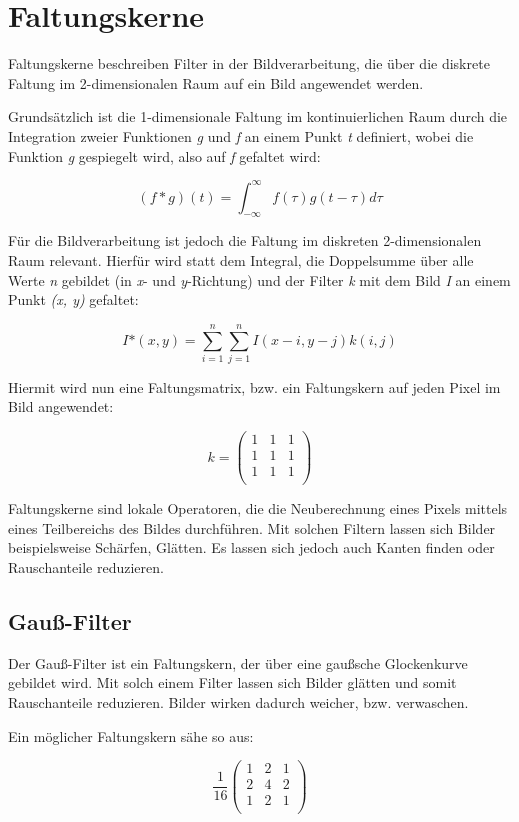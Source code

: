 \section{Faltungskerne} %
\label{sec:Faltungskerne}
Faltungskerne beschreiben Filter in der Bildverarbeitung, die über die diskrete Faltung im 2-dimensionalen
Raum auf ein Bild angewendet werden.

Grundsätzlich ist die 1-dimensionale Faltung im kontinuierlichen Raum durch die Integration zweier Funktionen {\em g} und {\em f} an einem Punkt {\em t} definiert, wobei die Funktion {\em g} gespiegelt wird, also auf {\em f} gefaltet wird:

$$ (f * g)(t) = \int_{-\infty}^{\infty} f(\tau)g(t - \tau) d\tau $$

Für die Bildverarbeitung ist jedoch die Faltung im diskreten 2-dimensionalen Raum relevant.
Hierfür wird statt dem Integral, die Doppelsumme über alle Werte {\em n} gebildet (in {\em x}- und {\em y}-Richtung) und der Filter {\em k} mit dem Bild {\em I} an einem Punkt {\em (x, y)} gefaltet:

$$ I\mbox{*}(x, y) = \sum_{i=1}^{n}\sum_{j=1}^{n} I(x - i, y - j)k(i, j) $$

Hiermit wird nun eine Faltungsmatrix, bzw. ein Faltungskern auf jeden Pixel im Bild angewendet:

$$ k = \left( \begin{array}{rrr}
1 & 1 & 1 \\
1 & 1 & 1 \\
1 & 1 & 1 \\
\end{array}\right) $$

Faltungskerne sind lokale Operatoren, die die Neuberechnung eines Pixels mittels eines Teilbereichs des Bildes durchführen.
Mit solchen Filtern lassen sich Bilder beispielsweise Schärfen, Glätten. Es lassen sich jedoch auch Kanten finden oder Rauschanteile reduzieren.

\subsection{Gauß-Filter}
Der Gauß-Filter ist ein Faltungskern, der über eine gaußsche Glockenkurve gebildet wird.
Mit solch einem Filter lassen sich Bilder glätten und somit Rauschanteile reduzieren.
Bilder wirken dadurch weicher, bzw. verwaschen.

Ein möglicher Faltungskern sähe so aus:

$$ \frac{1}{16} \left( \begin{array}{rrr}
1 & 2 & 1 \\
2 & 4 & 2 \\
1 & 2 & 1 \\
\end{array}\right) $$

